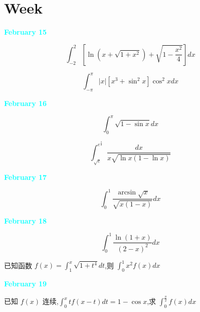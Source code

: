 \section{Week }
\textcolor{cyan}{\textbf{February 15}}

\begin{example}[][Exam: 28.3.1]
	$$\int_{-2}^{2}[\ln(x+\sqrt{1+x^{2}})+\sqrt{1-\dfrac{x^{2}}{4}}]dx$$
\end{example}

\begin{example}[][Exam: 28.3.2]
	$$\int_{-\pi}^{\pi}|x|[x^{3}+\sin^{2}x]\cos^{2}xdx$$
\end{example}

\textcolor{cyan}{\textbf{February 16}}

\begin{example}[][Exam: 28.3.3]
	$$\int_{0}^{\pi}\sqrt{1-\sin x}dx$$
\end{example}

\begin{example}[][Exam: 28.3.4]
	$$\int_{\sqrt{e}}^{e^{\frac{3}{4}}}\dfrac{dx}{x\sqrt{\ln x(1-\ln x)}}$$
\end{example}

\textcolor{cyan}{\textbf{February 17}}

\begin{example}[][Exam: 28.3.5]
	$$\int_{0}^{1}\dfrac{\arcsin \sqrt{x}}{\sqrt{x(1-x)}}dx$$
\end{example}

\textcolor{cyan}{\textbf{February 18}}

\begin{example}[][Exam: 28.3.6]
	$$\int_{0}^{1}\dfrac{\ln(1+x)}{(2-x)^{2}}dx$$
\end{example}

\begin{example}[][Exam: 28.3.7]
	已知函数 $f(x)=\int_{1}^{x}\sqrt{1+t^{4}}dt$,则 $\int_{0}^{1}x^{2}f(x)dx$
\end{example}

\textcolor{cyan}{\textbf{February 19}}

\begin{example}[][Exam: 28.3.8]
	已知 $f(x)$ 连续,$\int_{0}^{x}tf(x-t)dt=1-\cos x$,求 $\int_{0}^{\frac{\pi}{2}}f(x)dx$
\end{example}

